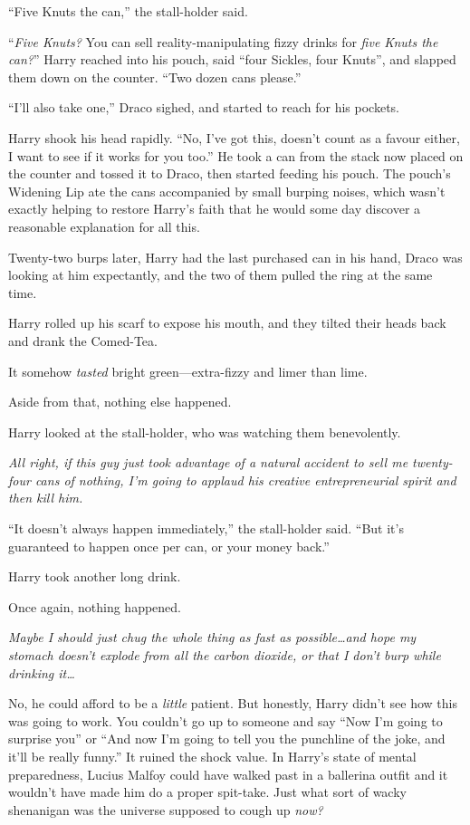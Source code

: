 “Five Knuts the can,” the stall-holder said.

“\emph{Five Knuts?} You can sell reality-manipulating fizzy drinks for \emph{five Knuts the can?}” Harry reached into his pouch, said “four Sickles, four Knuts”, and slapped them down on the counter. “Two dozen cans please.”

“I’ll also take one,” Draco sighed, and started to reach for his pockets.

Harry shook his head rapidly. “No, I’ve got this, doesn’t count as a favour either, I want to see if it works for you too.” He took a can from the stack now placed on the counter and tossed it to Draco, then started feeding his pouch. The pouch’s Widening Lip ate the cans accompanied by small burping noises, which wasn’t exactly helping to restore Harry’s faith that he would some day discover a reasonable explanation for all this.

Twenty-two burps later, Harry had the last purchased can in his hand, Draco was looking at him expectantly, and the two of them pulled the ring at the same time.

Harry rolled up his scarf to expose his mouth, and they tilted their heads back and drank the Comed-Tea.

It somehow \emph{tasted} bright green—extra-fizzy and limer than lime.

Aside from that, nothing else happened.

Harry looked at the stall-holder, who was watching them benevolently.

\emph{All right, if this guy just took advantage of a natural accident to sell me twenty-four cans of nothing, I’m going to applaud his creative entrepreneurial spirit and then kill him.}

“It doesn’t always happen immediately,” the stall-holder said. “But it’s guaranteed to happen once per can, or your money back.”

Harry took another long drink.

Once again, nothing happened.

\emph{Maybe I should just chug the whole thing as fast as possible…and hope my stomach doesn’t explode from all the carbon dioxide, or that I don’t burp while drinking it…}

No, he could afford to be a \emph{little} patient. But honestly, Harry didn’t see how this was going to work. You couldn’t go up to someone and say “Now I’m going to surprise you” or “And now I’m going to tell you the punchline of the joke, and it’ll be really funny.” It ruined the shock value. In Harry’s state of mental preparedness, Lucius Malfoy could have walked past in a ballerina outfit and it wouldn’t have made him do a proper spit-take. Just what sort of wacky shenanigan was the universe supposed to cough up \emph{now?}


